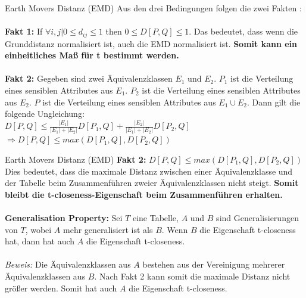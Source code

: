 \begin{frame}{Earth Movers Distanz (EMD)}
	Aus den drei Bedingungen folgen die zwei Fakten \cite{Li2007t-closseness}:\\
	\ \\
	\textbf{Fakt 1:} If $\forall i,j | 0 \le d_{ij} \le 1$ then $0 \le D[P,Q]  \le 1$. 
	Das bedeutet, dass wenn die Grunddistanz normalisiert ist, auch die EMD normalisiert ist. \textbf{Somit kann ein einheitliches Maß für t bestimmt werden.}\\
	\ \\
	\textbf{Fakt 2:} Gegeben sind zwei Äquivalenzklassen $E_1$ und $E_2$.
	$P_1$ ist die Verteilung eines sensiblen Attributes aus $E_1$.
	$P_2$ ist die Verteilung eines sensiblen Attributes aus $E_2$.
	$P$ ist die Verteilung eines sensiblen Attributes aus $E_1 \cup E_2$. Dann gilt die folgende Ungleichung: \\
	$D[P,Q] \le \frac{|E_1|}{|E_1|+|E_2|}D[P_1,Q] + \frac{|E_2|}{|E_1|+|E_2|}D[P_2,Q]$\\
	$\Rightarrow D[P,Q] \le max(D[P_1,Q], D[P_2,Q])$ 
\end{frame}

\begin{frame}{Earth Movers Distanz (EMD)}
	\textbf{Fakt 2:} $D[P,Q] \le max(D[P_1,Q], D[P_2,Q])$ 
	Dies bedeutet, dass die maximale Distanz zwischen einer Äquivalenzklasse und der Tabelle beim Zusammenführen zweier Äquivalenzklassen nicht steigt. \textbf{Somit bleibt die t-closeness-Eigenschaft beim Zusammenführen erhalten.} \\ 
	\ \\
	\textbf{Generalisation Property:} Sei $T$ eine Tabelle, $A$ und $B$ sind Generalisierungen von $T$, wobei $A$ mehr generalisiert ist als $B$. Wenn $B$ die Eigenschaft t-closeness hat, dann hat auch $A$ die Eigenschaft t-closeness.\\
	\ \\
	\textit{Beweis:} Die Äquivalenzklassen aus $A$ bestehen aus der Vereinigung mehrerer Äquivalenzklassen aus $B$. Nach Fakt 2 kann somit die maximale Distanz nicht größer werden. Somit hat auch $A$ die Eigenschaft t-closeness.  
\end{frame}

